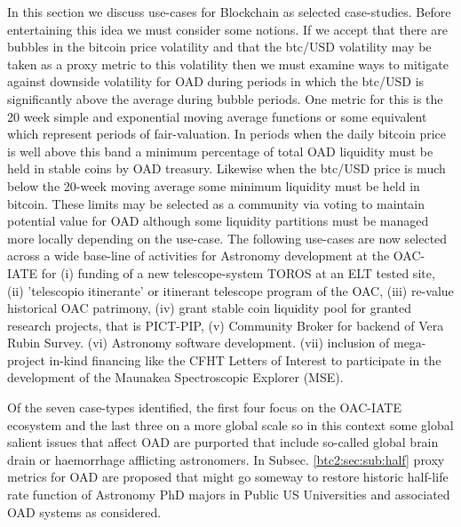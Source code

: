 \documentclass[final,5p,times,twocolumn,authoryear]{elsarticle}
\begin{document}
In this section we discuss use-cases for Blockchain as selected case-studies. Before entertaining this idea we must consider some notions. If we accept that there are bubbles in the bitcoin price volatility and that the btc/USD volatility may be taken as a proxy metric to this volatility then we must examine ways to mitigate against downside volatility for OAD during periods in which the btc/USD is significantly above the average during bubble periods. One metric for this is the 20 week simple and exponential moving average functions or some equivalent which represent periods of fair-valuation. In periods when the daily bitcoin price is well above this band a minimum percentage of total OAD liquidity must be held in stable coins by OAD treasury. Likewise when the btc/USD price is much below the 20-week moving average some minimum liquidity must be held in bitcoin. These limits may be selected as a community via voting to maintain potential value for OAD although some liquidity partitions must be managed more locally depending on the use-case. The following use-cases are now selected across a wide base-line of activities for Astronomy development at the OAC-IATE for (i) funding of a new telescope-system TOROS at an ELT tested site, (ii) 'telescopio itinerante' or itinerant telescope program of the OAC, (iii) re-value historical OAC patrimony, (iv) grant stable coin liquidity pool for granted research projects, that is PICT-PIP, (v) Community Broker for backend of Vera Rubin Survey. (vi) Astronomy software development. (vii) inclusion of mega-project in-kind financing like the CFHT
Letters of Interest to participate in the development of the Maunakea
Spectroscopic Explorer (MSE). 

Of the seven case-types identified, the first four focus on the OAC-IATE ecosystem and the last three on a more global scale so in this context some global salient issues that affect OAD are purported that include so-called global brain drain or haemorrhage afflicting astronomers. In Subsec. \ref{btc2:sec:sub:half} proxy metrics for OAD are proposed that might go someway to restore historic half-life rate function of Astronomy PhD majors in Public US Universities and associated OAD systems as considered. 
\end{document}
